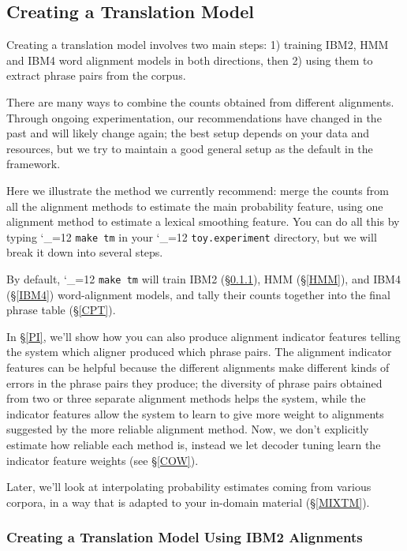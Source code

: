 \documentclass[11pt,letterpaper]{article}
\def\code{\begingroup\catcode`\_=12 \codex}
\newcommand{\codex}[1]{\texttt{#1}\endgroup}
\begin{document}
\subsection{Creating a Translation Model} \label{TM}

Creating a translation model involves two main steps: 1) training IBM2, HMM and
IBM4 word alignment models in both directions, then 2) using them to
extract phrase pairs from the corpus.

There are many ways to combine the counts obtained from different alignments.
Through ongoing experimentation, our recommendations have changed in the past
and will likely change again; the best setup depends on your data and
resources, but we try to maintain a good general setup as the default in the
framework.

Here we illustrate the method we currently recommend: merge the counts from all
the alignment methods to estimate the main probability feature, using one
alignment method to estimate a lexical smoothing feature.
You can do all this by typing \code{make tm} in your \code{toy.experiment}
directory, but we will break it down into several steps.

By default, \code{make tm} will train IBM2 (\S\ref{IBM2}), HMM (\S\ref{HMM}),
and IBM4 (\S\ref{IBM4}) word-alignment models, and tally their counts
together into the final phrase table (\S\ref{CPT}).

In \S\ref{PI}, we'll show how you can also produce alignment indicator features
telling the system which aligner produced which phrase pairs.  The alignment
indicator features can be helpful because the different alignments make different
kinds of errors in the phrase pairs they produce; the diversity of phrase
pairs obtained from two or three separate alignment methods helps the system,
while the indicator features allow the system to learn to give more weight to
alignments suggested by the more reliable alignment method.  Now, we don't
explicitly estimate how reliable each method is, instead we let decoder tuning
learn the indicator feature weights (see \S\ref{COW}).

Later, we'll look at interpolating probability estimates
coming from various corpora, in a way that is adapted to your in-domain
material (\S\ref{MIXTM}).

\subsubsection{Creating a Translation Model Using IBM2 Alignments} \label{IBM2}
\end{document}
